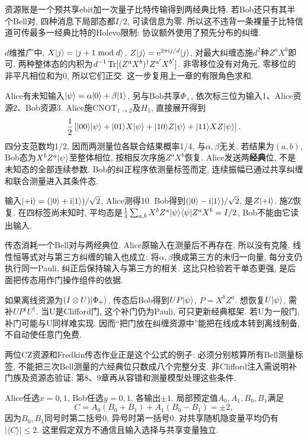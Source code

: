 资源账是一个预共享ebit加一次量子比特传输得到两经典比特. 若Bob还只有其半个Bell对, 四种消息下局部态都$I/2$, 可读信息为零. 所以这不违背一条裸量子比特信道可传最多一经典比特的Holevo限制: 协议额外使用了预先分布的纠缠.

$d$维推广中, $X\lvert j\rangle=\lvert j+1\bmod d\rangle$, $Z\lvert j\rangle=\mathrm e^{2\pi\mathrm i j/d}\lvert j\rangle$, 对最大纠缠态施$d^2$种$Z^aX^b$即可. 两种整体态的内积为$d^{-1}\operatorname{Tr}[(Z^aX^b)^\dagger Z^{a'}X^{b'}]$. 非零移位没有对角元, 零移位的非平凡相位和为0, 所以它们正交. 这一步复用上一章的有限角色求和.

Alice有未知输入$\lvert \psi\rangle=\alpha\lvert 0\rangle+\beta\lvert 1\rangle$, 另与Bob共享$\Phi_+$, 依次标三位为输入1、Alice资源2、Bob资源3. Alice施CNOT$_{1\to2}$及$H_1$, 直接展开得到
\[\frac12\left[\lvert 00\rangle\lvert \psi\rangle+\lvert 01\rangle X\lvert \psi\rangle+
\lvert 10\rangle Z\lvert \psi\rangle+\lvert 11\rangle XZ\lvert \psi\rangle\right].\]
四分支范数均1/2, 因而两测量位各联合结果概率1/4, 与$\alpha,\beta$无关. 若结果为$(a,b)$, Bob态为$X^bZ^a\lvert \psi\rangle$至整体相位, 按相反次序施$Z^aX^b$恢复. Alice发送两\textbf{经典}位, 不是未知态的全部连续参数. Bob的纠正程序依测量标签而定, 连续振幅已通过共享纠缠和联合测量进入其条件态.

\begin{example}输入$\lvert +\mathrm i\rangle=(\lvert 0\rangle+\mathrm i\lvert 1\rangle)/\sqrt2$, Alice测得10. Bob得到$(\lvert 0\rangle-\mathrm i\lvert 1\rangle)/\sqrt2$, 是$Z\lvert +\mathrm i\rangle$. 施Z恢复. 在四标签尚未知时, 平均态是$\frac14\sum_{a,b}X^bZ^a\lvert \psi\rangle\langle \psi\rvert Z^aX^b=I/2$, Bob不能由它读出输入.\end{example}

传态消耗一个Bell对与两经典位. Alice原输入在测量后不再存在, 所以没有克隆. 线性恒等式对与第三方纠缠的输入也成立: 将$\alpha,\beta$换成第三方的未归一向量, 每分支仍执行同一Pauli, 纠正后保持输入与第三方的相关. 这比只检验若干单态更强, 是后面把传态用作门操作组件的依据.

如果离线资源为$(I\otimes U)\lvert \Phi_+\rangle$, 传态后Bob得到$UP\lvert \psi\rangle$, $P=X^bZ^a$. 想恢复$U\lvert \psi\rangle$, 需补$UP^\dagger U^\dagger$. 当U是Clifford门, 这个补门仍为Pauli, 可只更新经典框架. 若U为一般门, 补门可能与U同样难实现. 因而“把门放在纠缠资源中”能把在线成本转到离线制备, 不自动使任意门免费.

两位CZ资源和Fredkin传态作业正是这个公式的例子: 必须分别核算所有Bell测量标签, 不能把三次Bell测量的六经典位只数成八个完整分支. 非Clifford注入需说明补门族及资源态验证; 第8、9章再从容错和测量模型处理这些条件.

Alice任选$x=0,1$, Bob任选$y=0,1$, 各输出$\pm1$. 局部预定值$A_0,A_1,B_0,B_1$满足
\[C=A_0(B_0+B_1)+A_1(B_0-B_1)=\pm2,\]
因为$B_0,B_1$同号时第二括号0, 异号时第一括号0. 对共享随机隐变量平均仍有$|\langle C\rangle|\le2$. 这里假定双方不通信且输入选择与共享变量独立.

